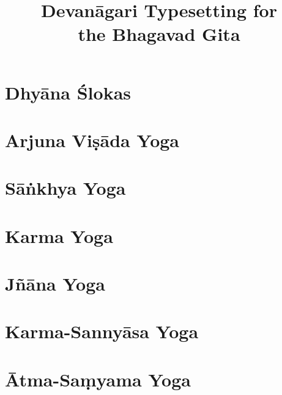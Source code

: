 \documentclass[headings=small]{scrbook}
\title{Devanāgari Typesetting for \\ the Bhagavad Gita}
\author{}
\begin{document}
\maketitle
\frontmatter

\tableofcontents
\newpage

\chapter{Dhyāna Ślokas}


\mainmatter
\chapter{Arjuna Viṣāda Yoga}
\begin{multicols}{2}
    
\end{multicols}

\chapter{Sāṅkhya Yoga}
\begin{multicols}{2}
    
\end{multicols}

\chapter{Karma Yoga}
\begin{multicols}{2}
    
\end{multicols}

\chapter{Jñāna Yoga}
\begin{multicols}{2}
    
\end{multicols}

\chapter{Karma-Sannyāsa Yoga}
\begin{multicols}{2}
    
\end{multicols}

\chapter{Ātma-Saṃyama Yoga}
\begin{multicols}{2}
    
\end{multicols}
\end{document}
